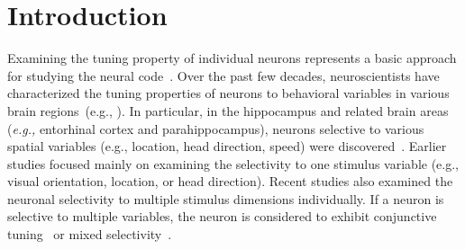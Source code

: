 \documentclass[11pt]{article}
\begin{document}





\newpage
\section{Introduction}


Examining the tuning property of individual neurons represents a basic approach for studying the neural code~\cite{Hubel1959,o1971,Hafting2005,Deangelis1991,decharms2000neural,Stensola2012,Kriegeskorte2021}. Over the past few decades, neuroscientists have characterized the tuning properties of neurons to behavioral variables in various brain regions~(e.g., \cite{Hafting2005,Deangelis1991,decharms2000neural,Stensola2012,Taube1990}). %
In particular, in the hippocampus and related brain areas (\textit{e.g.,} entorhinal cortex and parahippocampus), neurons selective to various spatial variables (e.g., location, head direction, speed) were discovered~\cite{o1971,o1978,Hafting2005,Stensola2012,Kropff2015speed,Taube1990}. Earlier studies focused mainly on examining the selectivity to one stimulus variable (e.g., visual orientation, location, or head direction). Recent studies also examined the neuronal selectivity to multiple stimulus dimensions individually. If a neuron is selective to multiple variables, the neuron is considered to exhibit conjunctive tuning~\cite{Sargolini2006conjunctive} or mixed selectivity~\cite{Rigotti2013,Fusi2016neurons,Hardcastle2017multiplexed}.
\end{document}
